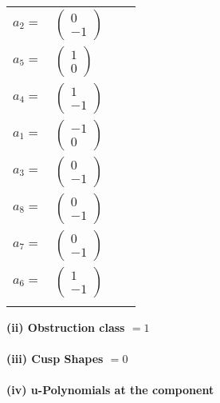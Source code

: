 \documentclass[1p]{elsarticle_modified}
\theoremstyle{definition}
\begin{document}
\begin{tabular}{m{7pt} m{180pt} m{7pt} m{180pt} }
\flushright $a_{2}=$&$\begin{pmatrix}0\\-1\end{pmatrix}$ \\
\flushright $a_{5}=$&$\begin{pmatrix}1\\0\end{pmatrix}$ \\
\flushright $a_{4}=$&$\begin{pmatrix}1\\-1\end{pmatrix}$ \\
\flushright $a_{1}=$&$\begin{pmatrix}-1\\0\end{pmatrix}$ \\
\flushright $a_{3}=$&$\begin{pmatrix}0\\-1\end{pmatrix}$ \\
\flushright $a_{8}=$&$\begin{pmatrix}0\\-1\end{pmatrix}$ \\
\flushright $a_{7}=$&$\begin{pmatrix}0\\-1\end{pmatrix}$ \\
\flushright $a_{6}=$&$\begin{pmatrix}1\\-1\end{pmatrix}$\\&\end{tabular}
\flushleft \textbf{(ii) Obstruction class $= 1$}\\~\\
\flushleft \textbf{(iii) Cusp Shapes $= 0$}\\~\\
\newpage\renewcommand{\arraystretch}{1}
\flushleft \textbf{(iv) u-Polynomials at the component}\newline \\
\end{document}
